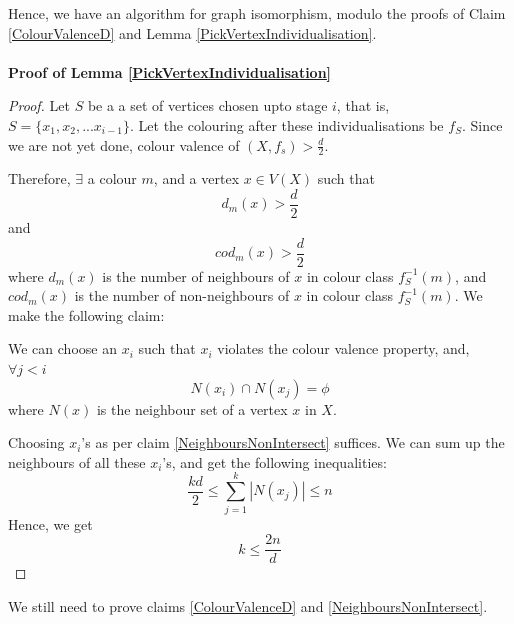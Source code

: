 Hence, we have an algorithm for graph isomorphism, modulo the proofs of Claim \ref{ColourValenceD} and Lemma \ref{PickVertexIndividualisation}.
\paragraph*{}
\textbf{Proof of Lemma \ref{PickVertexIndividualisation}}
\begin{proof}
Let $S$ be a a set of vertices chosen upto stage $i$, that is, $S = \lbrace x_1, x_2, ... x_{i-1} \rbrace$. Let the colouring after these individualisations be $f_S$.
Since we are not yet done, colour valence of $(X, f_s) > \frac{d}{2}$.

Therefore, $\exists$ a colour $m$, and a vertex $x \in V(X)$ such that
\[
d_m (x) > \frac{d}{2}
\]
and 
\[
cod_m (x) > \frac{d}{2}
\]
where $d_m(x)$ is the number of neighbours of $x$ in colour class $f_S^{-1}(m)$, and $cod_m(x)$ is the number of non-neighbours of $x$ in colour class $f_S^{-1}(m)$.
We make the following claim:
\begin{claim}\label{NeighboursNonIntersect}
We can choose an $x_i$ such that $x_i$ violates the colour valence property, and,  
$\forall j < i$
\[
N(x_i) \cap N(x_j) = \phi 
\]
where $N(x)$ is the neighbour set of a vertex $x$ in $X$.
\end{claim}
Choosing $x_i$'s as per claim \ref{NeighboursNonIntersect} suffices. We can sum up the neighbours of all these $x_i$'s, and get the following inequalities:
\[
\frac{kd}{2} \le \sum_{j=1}^k |N(x_j)| \le n
\] 
Hence, we get 
\[
k \le \frac{2n}{d}
\]
\end{proof}

We still need to prove claims \ref{ColourValenceD} and \ref{NeighboursNonIntersect}.